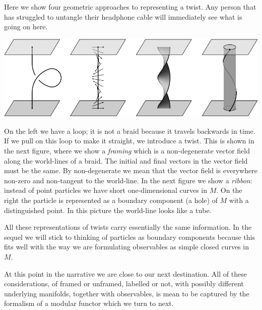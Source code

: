 Here we show four 
geometric approaches to representing a twist.
Any person that has struggled to untangle their headphone cable
will immediately see what is going on here.
\begin{center}
\includegraphics[width=1.0\columnwidth]{pic-framed.pdf}
\end{center}
On the left we have a loop; it is not a braid because it
travels backwards in time.
If we pull on this loop to make it straight, we introduce a twist.
This is shown in the next figure, 
where we show a \emph{framing} which is a non-degenerate 
vector field along the world-lines of a braid.
The initial and final vectors in the vector field must be the same.
By non-degenerate we mean that the vector field is everywhere
non-zero and non-tangent to the world-line.
In the next figure we show a \emph{ribbon}:
instead of point particles we have short one-dimensional curves in $M$.
On the right the particle is represented as a boundary
component (a hole) of $M$ with a distinguished point.
In this picture the world-line looks like a tube.

All these representations of twists carry
essentially the same information.
In the sequel we will stick
to thinking of particles as boundary
components because this fits well
with the way we are formulating 
observables as simple closed curves in $M$.

At this point in the narrative we are 
close to our next destination.
All of these considerations,
of framed or unframed, 
labelled or not,
with possibly different underlying manifolds,
together with observables,
is mean to
be captured by the formalism of a modular functor which we turn to next.


